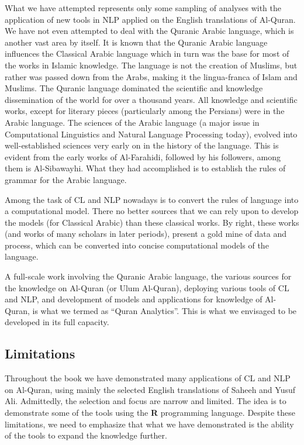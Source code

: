 \documentclass[
]{article}
\begin{document}
What we have attempted represents only some sampling of analyses with the application of new tools in NLP applied on the English translations of Al-Quran. We have not even attempted to deal with the Quranic Arabic language, which is another vast area by itself. It is known that the Quranic Arabic language influences the Classical Arabic language which in turn was the base for most of the works in Islamic knowledge. The language is not the creation of Muslims, but rather was passed down from the Arabs, making it the lingua-franca of Islam and Muslims. The Quranic language dominated the scientific and knowledge dissemination of the world for over a thousand years. All knowledge and scientific works, except for literary pieces (particularly among the Persians) were in the Arabic language. The sciences of the Arabic language (a major issue in Computational Linguistics and Natural Language Processing today), evolved into well-established sciences very early on in the history of the language. This is evident from the early works of Al-Farahidi, followed by his followers, among them is Al-Sibawayhi. What they had accomplished is to establish the rules of grammar for the Arabic language.

Among the task of CL and NLP nowadays is to convert the rules of language into a computational model. There no better sources that we can rely upon to develop the models (for Classical Arabic) than these classical works. By right, these works (and works of many scholars in later periods), present a gold mine of data and process, which can be converted into concise computational models of the language.

A full-scale work involving the Quranic Arabic language, the various sources for the knowledge on Al-Quran (or Ulum Al-Quran), deploying various tools of CL and NLP, and development of models and applications for knowledge of Al-Quran, is what we termed as ``Quran Analytics''. This is what we envisaged to be developed in its full capacity.

\hypertarget{limitations}{%
\subsection*{Limitations}\label{limitations}}

Throughout the book we have demonstrated many applications of CL and NLP on Al-Quran, using mainly the selected English translations of Saheeh and Yusuf Ali. Admittedly, the selection and focus are narrow and limited. The idea is to demonstrate some of the tools using the \textbf{R} programming language. Despite these limitations, we need to emphasize that what we have demonstrated is the ability of the tools to expand the knowledge further.
\end{document}

